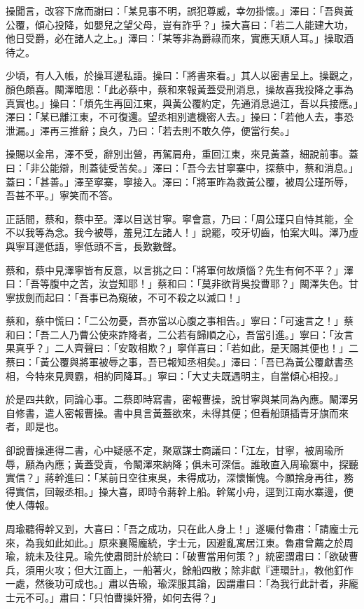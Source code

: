 操聞言，改容下席而謝曰：「某見事不明，誤犯尊威，幸勿掛懷。」澤曰：「吾與黃公覆，傾心投降，如嬰兒之望父母，豈有詐乎？」操大喜曰：「若二人能建大功，他日受爵，必在諸人之上。」澤曰：「某等非為爵祿而來，實應天順人耳。」操取酒待之。

少頃，有人入帳，於操耳邊私語。操曰：「將書來看。」其人以密書呈上。操觀之，顏色頗喜。闞澤暗思：「此必蔡中，蔡和來報黃蓋受刑消息，操故喜我投降之事為真實也。」操曰：「煩先生再回江東，與黃公覆約定，先通消息過江，吾以兵接應。」澤曰：「某已離江東，不可復還。望丞相別遣機密人去。」操曰：「若他人去，事恐泄漏。」澤再三推辭；良久，乃曰：「若去則不敢久停，便當行矣。」

操賜以金帛，澤不受，辭別出營，再駕肩舟，重回江東，來見黃蓋，細說前事。蓋曰：「非公能辯，則蓋徒受苦矣。」澤曰：「吾今去甘寧寨中，探蔡中，蔡和消息。」蓋曰：「甚善。」澤至寧寨，寧接入。澤曰：「將軍昨為救黃公覆，被周公瑾所辱，吾甚不平。」寧笑而不答。

正話間，蔡和，蔡中至。澤以目送甘寧。寧會意，乃曰：「周公瑾只自恃其能，全不以我等為念。我今被辱，羞見江左諸人！」說罷，咬牙切齒，怕案大叫。澤乃虛與寧耳邊低語，寧低頭不言，長歎數聲。

蔡和，蔡中見澤寧皆有反意，以言挑之曰：「將軍何故煩惱？先生有何不平？」澤曰：「吾等腹中之苦，汝豈知耶！」蔡和曰：「莫非欲背吳投曹耶？」闞澤失色。甘寧拔劍而起曰：「吾事已為窺破，不可不殺之以滅口！」

蔡和，蔡中慌曰：「二公勿憂，吾亦當以心腹之事相告。」寧曰：「可速言之！」蔡和曰：「吾二人乃曹公使來詐降者，二公若有歸順之心，吾當引進。」寧曰：「汝言果真乎？」二人齊聲曰：「安敢相欺？」寧佯喜曰：「若如此，是天賜其便也！」二蔡曰：「黃公覆與將軍被辱之事，吾已報知丞相矣。」澤曰：「吾已為黃公覆獻書丞相，今特來見興霸，相約同降耳。」寧曰：「大丈夫既遇明主，自當傾心相投。」

於是四共飲，同論心事。二蔡即時寫書，密報曹操，說甘寧與某同為內應。闞澤另自修書，遣人密報曹操。書中具言黃蓋欲來，未得其便；但看船頭插青牙旗而來者，即是也。

卻說曹操連得二書，心中疑感不定，聚眾謀士商議曰：「江左，甘寧，被周瑜所辱，願為內應；黃蓋受責，令闞澤來納降；俱未可深信。誰敢直入周瑜寨中，探聽實信？」蔣幹進曰：「某前日空往東吳，未得成功，深懷慚愧。今願捨身再往，務得實信，回報丞相。」操大喜，即時令蔣幹上船。幹駕小舟，逕到江南水寨邊，便使人傳報。

周瑜聽得幹又到，大喜曰：「吾之成功，只在此人身上！」遂囑付魯肅：「請龐士元來，為我如此如此。」原來襄陽龐統，字士元，因避亂寓居江東。魯肅曾薦之於周瑜，統未及往見。瑜先使肅問計於統曰：「破曹當用何策？」統密謂肅曰：「欲破曹兵，須用火攻；但大江面上，一船著火，餘船四散；除非獻『連環計』，教他釘作一處，然後功可成也。」肅以告瑜，瑜深服其論，因謂肅曰：「為我行此計者，非龐士元不可。」肅曰：「只怕曹操奸猾，如何去得？」

